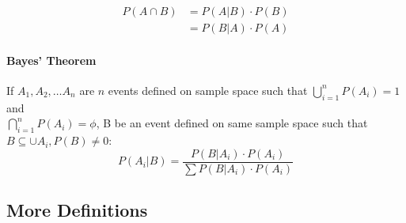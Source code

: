 \documentclass[
10pt, %
a4paper, %
]{report}
\begin{document}
\begin{align*}
    P(A\cap B) &= P(A|B) \cdot P(B) \\
               &= P(B|A) \cdot P(A)
\end{align*}

\paragraph{Bayes' Theorem}
If \(A_1, A_2, \dots A_n\) are \(n\) events defined on sample space such that \(\bigcup_{i=1}^n P(A_i)=1\) and \\ \(\bigcap_{i=1}^n P(A_i)=\phi\), B be an event defined on same sample space such that \(B\subseteq \cup A_i, P(B)\neq 0\):
\[
P(A_i| B) = \frac{P(B|A_i)\cdot P(A_i)}{\sum P(B|A_i)\cdot P(A_i)}
\]

\subsection*{More Definitions}
\end{document}
